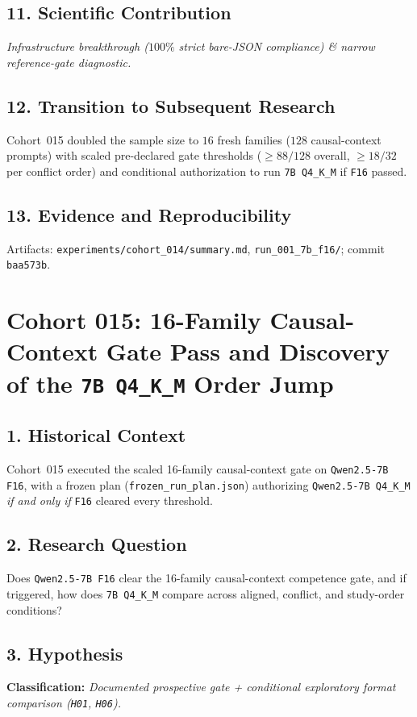 \subsection*{11. Scientific Contribution}
\emph{Infrastructure breakthrough ($100\%$ strict bare-JSON compliance) \& narrow reference-gate diagnostic.}

\subsection*{12. Transition to Subsequent Research}
Cohort~015 doubled the sample size to $16$ fresh families ($128$ causal-context prompts) with scaled pre-declared gate thresholds ($\ge 88/128$ overall, $\ge 18/32$ per conflict order) and conditional authorization to run \texttt{7B Q4\_K\_M} if \texttt{F16} passed.

\subsection*{13. Evidence and Reproducibility}
Artifacts: \texttt{experiments/cohort\_014/summary.md}, \texttt{run\_001\_7b\_f16/}; commit \texttt{baa573b}.

\section{Cohort 015: 16-Family Causal-Context Gate Pass and Discovery of the \texttt{7B Q4\_K\_M} Order Jump}

\subsection*{1. Historical Context}
Cohort~015 executed the scaled 16-family causal-context gate on \texttt{Qwen2.5-7B F16}, with a frozen plan (\texttt{frozen\_run\_plan.json}) authorizing \texttt{Qwen2.5-7B Q4\_K\_M} \emph{if and only if} \texttt{F16} cleared every threshold.

\subsection*{2. Research Question}
Does \texttt{Qwen2.5-7B F16} clear the 16-family causal-context competence gate, and if triggered, how does \texttt{7B Q4\_K\_M} compare across aligned, conflict, and study-order conditions?

\subsection*{3. Hypothesis}
\textbf{Classification:} \emph{Documented prospective gate + conditional exploratory format comparison (\texttt{H01}, \texttt{H06}).}

